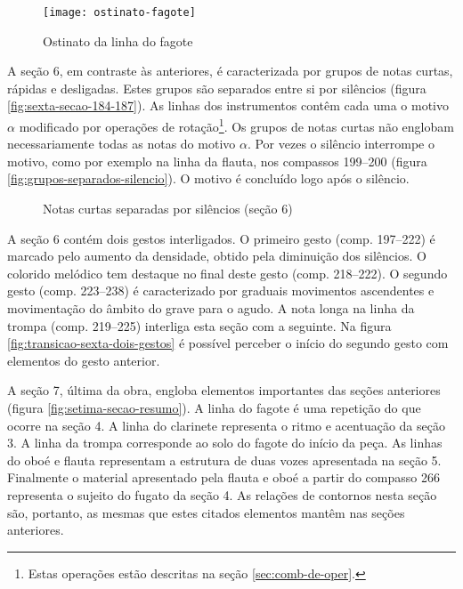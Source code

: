\begin{figure}
  \centering
  \texttt{[image: ostinato-fagote]}
  \caption{Ostinato da linha do fagote}
  \label{fig:ostinato-fagote}
\end{figure}

A seção 6, em contraste às anteriores, é caracterizada por grupos de
notas curtas, rápidas e desligadas. Estes grupos são separados entre
si por silêncios (figura \ref{fig:sexta-secao-184-187}). As linhas dos
instrumentos contêm cada uma o motivo $\alpha$ modificado por
operações de rotação\footnote{Estas operações estão descritas na seção
  \ref{sec:comb-de-oper}.}. Os grupos de notas curtas não englobam
necessariamente todas as notas do motivo $\alpha$. Por vezes o
silêncio interrompe o motivo, como por exemplo na linha da flauta, nos
compassos 199--200 (figura \ref{fig:grupos-separados-silencio}). O
motivo é concluído logo após o silêncio.

\begin{figure}
  \centering


  \caption{Notas curtas separadas por silêncios (seção 6)}
  \label{fig:sexta-secao-notas-curtas}
\end{figure}

A seção 6 contém dois gestos interligados. O primeiro gesto
(comp. 197--222) é marcado pelo aumento da densidade, obtido pela
diminuição dos silêncios. O colorido melódico tem destaque no final
deste gesto (comp. 218--222). O segundo gesto (comp. 223--238) é
caracterizado por graduais movimentos ascendentes e movimentação do
âmbito do grave para o agudo. A nota longa na linha da trompa
(comp. 219--225) interliga esta seção com a seguinte. Na figura
\ref{fig:transicao-sexta-dois-gestos} é possível perceber o início do
segundo gesto com elementos do gesto anterior.

A seção 7, última da obra, engloba elementos importantes das seções
anteriores (figura \ref{fig:setima-secao-resumo}). A linha do fagote é
uma repetição do que ocorre na seção 4. A linha do clarinete
representa o ritmo e acentuação da seção 3. A linha da trompa
corresponde ao solo do fagote do início da peça. As linhas do oboé e
flauta representam a estrutura de duas vozes apresentada na seção
5. Finalmente o material apresentado pela flauta e oboé a partir do
compasso 266 representa o sujeito do fugato da seção 4. As relações de
contornos nesta seção são, portanto, as mesmas que estes citados
elementos mantêm nas seções anteriores.

